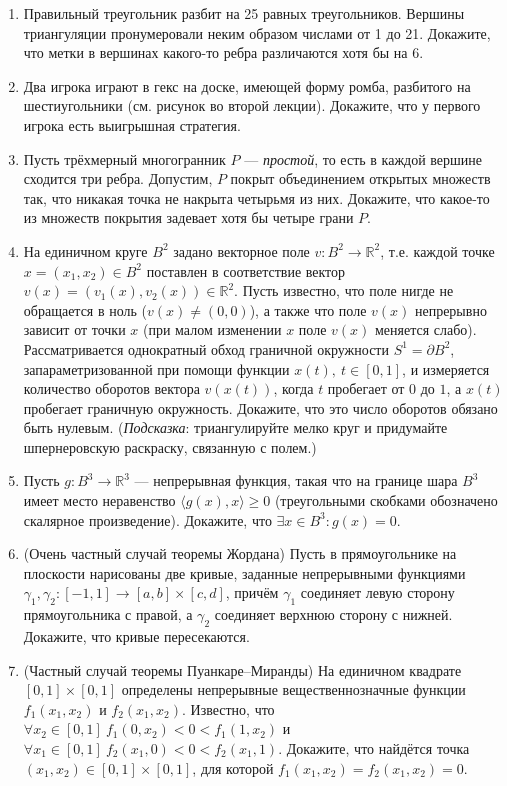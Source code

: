 \documentclass[12pt]{article}
\def\ra{\rightarrow}
\def\RR{\mathbb{R}}
\begin{document}
\begin{enumerate}
  \item Правильный треугольник разбит на 25 равных треугольников. Вершины триангуляции пронумеровали неким образом числами от 1 до 21. Докажите, что метки в вершинах какого-то ребра различаются хотя бы на 6.

  \item Два игрока играют в гекс на доске, имеющей форму ромба, разбитого на шестиугольники (см. рисунок во второй лекции). Докажите, что у первого игрока есть выигрышная стратегия.
      
  \item Пусть трёхмерный многогранник $P$ --- \emph{простой}, то есть в каждой вершине сходится три ребра. Допустим, $P$ покрыт объединением открытых множеств так, что никакая точка не накрыта четырьмя из них. Докажите, что какое-то из множеств покрытия задевает хотя бы четыре грани $P$.

  \item На единичном круге $B^2$ задано векторное поле $v: B^2 \ra \RR^2$, т.е. каждой точке $x = (x_1,x_2) \in B^2$ поставлен в соответствие вектор $v(x) = (v_1(x), v_2(x)) \in \RR^2$. Пусть известно, что поле нигде не обращается в ноль ($v(x) \neq (0,0)$), а также что поле $v(x)$ непрерывно зависит от точки $x$ (при малом изменении $x$ поле $v(x)$ меняется слабо). Рассматривается однократный обход граничной окружности $S^1 = \partial B^2$, запараметризованной при помощи функции $x(t), \ t\in[0,1]$, и измеряется количество оборотов вектора $v(x(t))$, когда $t$ пробегает от $0$ до $1$, а $x(t)$ пробегает граничную окружность. Докажите, что это число оборотов обязано быть нулевым.
  (\emph{Подсказка}: триангулируйте мелко круг и придумайте шпернеровскую раскраску, связанную с полем.)

  \item Пусть $g : B^3 \ra \RR^3$ --- непрерывная функция, такая что на границе шара $B^3$ имеет место неравенство $\langle g(x),x \rangle \geqslant 0$ (треугольными скобками обозначено скалярное произведение). Докажите, что $\exists x \in B^3 : g(x)=0$.

  \item (Очень частный случай теоремы Жордана) Пусть в прямоугольнике на плоскости нарисованы две кривые, заданные непрерывными функциями $\gamma_1, \gamma_2: [-1,1] \to [a,b]\times [c,d]$, причём $\gamma_1$ соединяет левую сторону прямоугольника с правой, а $\gamma_2$ соединяет верхнюю сторону с нижней. Докажите, что кривые пересекаются.

  \item (Частный случай теоремы Пуанкаре--Миранды) На единичном квадрате $[0,1]\times[0,1]$ определены непрерывные вещественнозначные функции $f_1(x_1, x_2)$ и $ f_2(x_1, x_2)$. Известно, что $\forall x_2\in[0,1] \ f_1(0,x_2) < 0 < f_1(1,x_2)$ и $\forall x_1\in[0,1] \ f_2(x_1,0) < 0 < f_2(x_1,1)$. Докажите, что найдётся точка $(x_1, x_2) \in [0,1]\times[0,1]$, для которой $f_1(x_1, x_2) = f_2(x_1, x_2) = 0$.


\end{enumerate}
\end{document}
